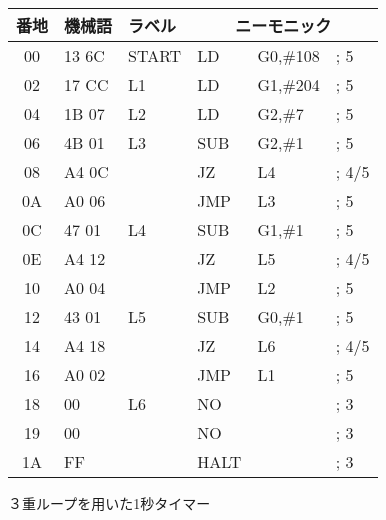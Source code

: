 \begin{figure}[btp]
{\small\tt\begin{center}
\begin{tabular}{|c|l|l|l l l|} \hline
番地 & 機械語 & ラベル & \multicolumn{3}{|c|}{ニーモニック} \\
\hline
00 & 13 6C & START & LD    & G0,\#108       & ; 5    \\
02 & 17 CC & L1    & LD    & G1,\#204       & ; 5    \\
04 & 1B 07 & L2    & LD    & G2,\#7         & ; 5    \\
06 & 4B 01 & L3    & SUB   & G2,\#1         & ; 5    \\
08 & A4 0C &       & JZ    & L4             & ; 4/5  \\
0A & A0 06 &       & JMP   & L3             & ; 5    \\
0C & 47 01 & L4    & SUB   & G1,\#1         & ; 5    \\
0E & A4 12 &       & JZ    & L5             & ; 4/5  \\
10 & A0 04 &       & JMP   & L2             & ; 5    \\
12 & 43 01 & L5    & SUB   & G0,\#1         & ; 5    \\
14 & A4 18 &       & JZ    & L6             & ; 4/5  \\
16 & A0 02 &       & JMP   & L1             & ; 5    \\
18 & 00    & L6    & NO    &                & ; 3    \\
19 & 00    &       & NO    &                & ; 3    \\
1A & FF    &       & HALT  &                & ; 3    \\
\hline
\end{tabular}
\end{center}}
\caption{３重ループを用いた1秒タイマー}
\label{fig:chap6:loop3}
\end{figure}

\newpage
